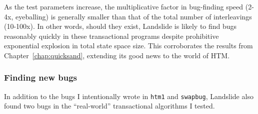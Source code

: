 As the test parameters increase,
the multiplicative factor in bug-finding speed (2-4x, eyeballing) is generally smaller
than that of the total number of interleavings (10-100x).
In other words,
should they exist,
Landslide is likely to find bugs reasonably quickly in these transactional programs
despite prohibitive exponential explosion in total state space size.
This corroborates the results from Chapter~\ref{chap:quicksand},
extending its good news to the world of HTM.

\subsubsection{Finding new bugs}

In addition to the bugs I intentionally wrote in {\tt htm1} and {\tt swapbug},
Landslide also found two bugs in the ``real-world'' transactional algorithms I tested.
